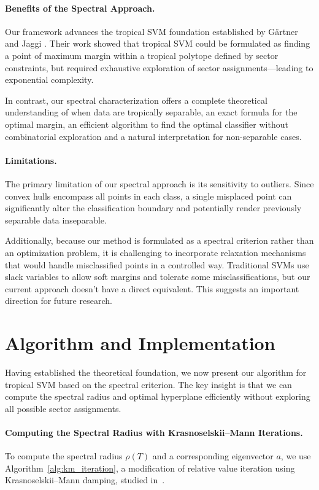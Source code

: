 \documentclass{article}
\begin{document}
\paragraph{Benefits of the Spectral Approach.} 
Our framework advances the tropical SVM foundation established by Gärtner and Jaggi \cite{gartner2008}. Their work showed that tropical SVM could be formulated as finding a point of maximum margin within a tropical polytope defined by sector constraints, but required exhaustive exploration of sector assignments—leading to exponential complexity.

In contrast, our spectral characterization offers a complete theoretical understanding of when data are tropically separable, an exact formula for the optimal margin, an efficient algorithm to find the optimal classifier without combinatorial exploration and a natural interpretation for non-separable cases.

\paragraph{Limitations.} 
The primary limitation of our spectral approach is its sensitivity to outliers. Since convex hulls encompass all points in each class, a single misplaced point can significantly alter the classification boundary and potentially render previously separable data inseparable.

Additionally, because our method is formulated as a spectral criterion rather than an optimization problem, it is challenging to incorporate relaxation mechanisms that would handle misclassified points in a controlled way. Traditional SVMs use slack variables to allow soft margins and tolerate some misclassifications, but our current approach doesn't have a direct equivalent. This suggests an important direction for future research.

\section{Algorithm and Implementation}\label{sec:algorithm}

Having established the theoretical foundation, we now present our algorithm for tropical SVM based on the spectral criterion. The key insight is that we can compute the spectral radius and optimal hyperplane efficiently without exploring all possible sector assignments.


\paragraph{Computing the Spectral Radius with Krasnoselskii--Mann Iterations.}
\label{subsec:spectral_computation}
To compute the spectral radius $\rho(T)$ and a corresponding eigenvector $a$, we use
Algorithm~\ref{alg:km_iteration}, a modification of relative value
iteration using Krasnoselskii--Mann damping, studied
in~\cite{akianmfcs}.
\end{document}
